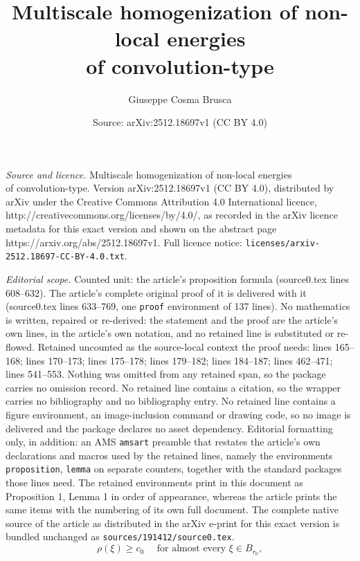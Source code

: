 \documentclass[10pt,a4paper]{amsart}
\title{Multiscale homogenization of non-local energies \\ of convolution-type}
\author{Giuseppe Cosma Brusca}
\date{Source: arXiv:2512.18697v1 (CC BY 4.0)}
\begin{document}
\maketitle

\noindent\emph{Source and licence.} Multiscale homogenization of non-local energies \\ of convolution-type. Version arXiv:2512.18697v1 (CC BY 4.0), distributed by arXiv under the Creative Commons Attribution 4.0 International licence, http://creativecommons.org/licenses/by/4.0/, as recorded in the arXiv licence metadata for this exact version and shown on the abstract page https://arxiv.org/abs/2512.18697v1. Full licence notice: \texttt{licenses/arxiv-2512.18697-CC-BY-4.0.txt}.\par\smallskip

\noindent\textit{Editorial scope.} Counted unit: the article's proposition formula (source0.tex lines 608--632). The article's complete original proof of it is delivered with it (source0.tex lines 633--769, one \texttt{proof} environment of 137 lines). No mathematics is written, repaired or re-derived: the statement and the proof are the article's own lines, in the article's own notation, and no retained line is substituted or re-flowed.  Retained uncounted as the source-local context the proof needs: lines 165--168; lines 170--173; lines 175--178; lines 179--182; lines 184--187; lines 462--471; lines 541--553.  Nothing was omitted from any retained span, so the package carries no omission record.  No retained line contains a citation, so the wrapper carries no bibliography and no bibliography entry.  No retained line contains a figure environment, an image-inclusion command or drawing code, so no image is delivered and the package declares no asset dependency.  Editorial formatting only, in addition: an AMS \texttt{amsart} preamble that restates the article's own declarations and macros used by the retained lines, namely the environments \texttt{proposition}, \texttt{lemma} on separate counters, together with the standard packages those lines need.  The retained environments print in this document as Proposition 1, Lemma 1 in order of appearance, whereas the article prints the same items with the numbering of its own full document.  The complete native source of the article as distributed in the arXiv e-print for this exact version is bundled unchanged as \texttt{sources/191412/source0.tex}.
\begin{equation}\label{rho : ball}
\tag{$\rho_1$}
    \rho(\xi)\geq c_0 \quad \text{ for almost every } \xi\in B_{r_0},
\end{equation}
\end{document}
